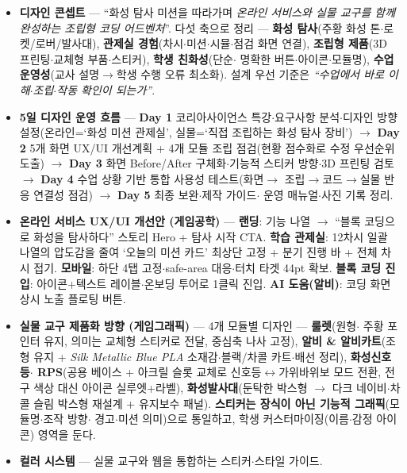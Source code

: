 \begin{itemize}
  \item \textbf{디자인 콘셉트} — ``화성 탐사 미션을 따라가며 \emph{온라인 서비스와 실물
  교구를 함께 완성하는 조립형 코딩 어드벤처}''. 다섯 축으로 정리 — \textbf{화성 탐사}(주황
  화성 톤$\cdot$로켓/로버/발사대), \textbf{관제실 경험}(차시$\cdot$미션$\cdot$시뮬$\cdot$점검 화면
  연결), \textbf{조립형 제품}(3D 프린팅$\cdot$교체형 부품$\cdot$스티커), \textbf{학생 친화성}(단순$\cdot$%
  명확한 버튼$\cdot$아이콘$\cdot$모듈명), \textbf{수업 운영성}(교사 설명$\to$학생 수행 오류 최소화).
  설계 우선 기준은 \emph{``수업에서 바로 이해$\cdot$조립$\cdot$작동 확인이 되는가''}.
  \item \textbf{5일 디자인 운영 흐름} — \textbf{Day 1} 코리아사이언스 특강$\cdot$요구사항
  분석$\cdot$디자인 방향 설정(온라인=‘화성 미션 관제실’, 실물=‘직접 조립하는 화성 탐사
  장비’) $\to$ \textbf{Day 2} 5개 화면 UX/UI 개선계획 + 4개 모듈 조립 점검(현황 점수화로
  수정 우선순위 도출) $\to$ \textbf{Day 3} 화면 Before/After 구체화$\cdot$기능적 스티커
  방향$\cdot$3D 프린팅 검토 $\to$ \textbf{Day 4} 수업 상황 기반 통합 사용성 테스트(화면$\to$%
  조립$\to$코드$\to$실물 반응 연결성 점검) $\to$ \textbf{Day 5} 최종 보완$\cdot$제작 가이드$\cdot$%
  운영 매뉴얼$\cdot$사진 기록 정리.
  \item \textbf{온라인 서비스 UX/UI 개선안 (게임공학)} — \textbf{랜딩}: 기능 나열 $\to$
  ``블록 코딩으로 화성을 탐사하다'' 스토리 Hero + 탐사 시작 CTA. \textbf{학습 관제실}:
  12차시 일괄 나열의 압도감을 줄여 ‘오늘의 미션 카드’ 최상단 고정 + 분기 진행 바 +
  전체 차시 접기. \textbf{모바일}: 하단 4탭 고정$\cdot$safe-area 대응$\cdot$터치 타겟 44pt
  확보. \textbf{블록 코딩 진입}: 아이콘+텍스트 레이블$\cdot$온보딩 투어로 1클릭 진입.
  \textbf{AI 도움(알비)}: 코딩 화면 상시 노출 플로팅 버튼.
  \item \textbf{실물 교구 제품화 방향 (게임그래픽)} — 4개 모듈별 디자인 — \textbf{룰렛}(원형$\cdot$%
  주황 포인터 유지, 의미는 교체형 스티커로 전달, 중심축 나사 고정), \textbf{알비 \& 알비카트}(조형
  유지 + \emph{Silk Metallic Blue PLA} 소재감$\cdot$블랙/차콜 카트$\cdot$배선 정리), \textbf{화성신호등$\cdot$%
  RPS}(공용 베이스 + 아크릴 슬롯 교체로 신호등$\leftrightarrow$가위바위보 모드 전환, 전구 색상 대신
  아이콘 실루엣+라벨), \textbf{화성발사대}(둔탁한 박스형 $\to$ 다크 네이비$\cdot$차콜 슬림 박스형
  재설계 + 유지보수 패널). \textbf{스티커는 장식이 아닌 기능적 그래픽}(모듈명$\cdot$조작 방향$\cdot$%
  경고$\cdot$미션 의미)으로 통일하고, 학생 커스터마이징(이름$\cdot$감정 아이콘) 영역을 둔다.
  \item \textbf{컬러 시스템} — 실물 교구와 웹을 통합하는 스티커$\cdot$스타일 가이드.

\end{itemize}
